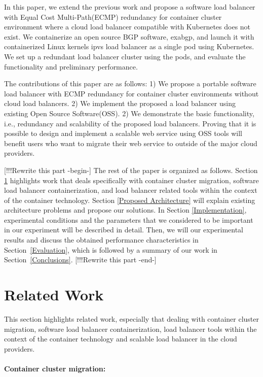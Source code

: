 In this paper, we extend the previous work and propose a software load balancer with Equal Cost Multi-Path(ECMP)\cite{thaler2000multipath} redundancy for container cluster environment where a cloud load balancer compatible with Kubernetes does not exist.
We containerize an open source BGP software, exabgp\cite{exa-networks_2018}, and launch it with containerized Linux kernels ipvs load balancer as a single pod using Kubernetes.
We set up a redundant load balancer cluster using the pods, and evaluate the functionality and preliminary performance.

The contributions of this paper are as follows:
1) We propose a portable software load balancer with ECMP redundancy for container cluster environments without cloud load balancers.
2) We implement the proposed a load balancer using existing Open Source Software(OSS).
2) We demonstrate the basic functionality, i.e., redundancy and scalability of the proposed load balancers.
Proving that it is possible to design and implement a scalable web service using OSS tools will benefit users who want to migrate their web service to outside of the major cloud providers.

[!!!Rewrite this part -begin-]
The rest of the paper is organized as follows.
Section \ref{Related Work} highlights work that deals specifically with container cluster migration,
software load balancer containerization, and load balancer related tools within the context of the container technology.
Section \ref{Proposed Architecture} will explain existing architecture problems and propose our solutions.
In Section \ref{Implementation}, experimental conditions and the parameters
that we considered to be important in our experiment will be described in detail.
Then, we will our experimental results and discuss the obtained performance characteristics in Section~\ref{Evaluation}, which is followed by a summary of our work in Section~\ref{Conclusions}.
[!!!Rewrite this part -end-]

\section{Related Work}\label{Related Work}

This section highlights related work, especially that dealing with container cluster migration, 
software load balancer containerization, load balancer tools within the context of the container technology and scalable load balancer in the cloud providers.

\paragraph{\bf Container cluster migration:}

